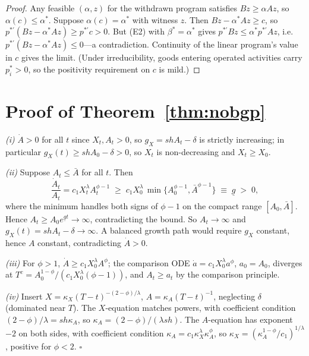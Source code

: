 \documentclass[11pt]{article}
\begin{document}
\begin{proof}
Any feasible $(\alpha,z)$ for the withdrawn program satisfies $Bz \ge \alpha Az$, so $\alpha(c) \le \alpha^{*}$. Suppose $\alpha(c)=\alpha^{*}$ with witness $z$. Then $Bz - \alpha^{*}Az \ge c$, so $p^{*\prime}(Bz-\alpha^{*}Az) \ge p^{*\prime}c > 0$. But (E2) with $\beta^{*}=\alpha^{*}$ gives $p^{*\prime}Bz \le \alpha^{*}p^{*\prime}Az$, i.e.\ $p^{*\prime}(Bz-\alpha^{*}Az) \le 0$---a contradiction. Continuity of the linear program's value in $c$ gives the limit. (Under irreducibility, goods entering operated activities carry $p^{*}_i>0$, so the positivity requirement on $c$ is mild.)
\end{proof}

\section{Proof of Theorem~\ref{thm:nobgp}}\label{app:nobgp}

\emph{(i)} $\dot A>0$ for all $t$ since $X_t,A_t>0$, so $g_X = shA_t-\delta$ is strictly increasing; in particular $g_X(t) \ge shA_0-\delta>0$, so $X_t$ is non-decreasing and $X_t \ge X_0$.

\emph{(ii)} Suppose $A_t \le \bar A$ for all $t$. Then
\[
\frac{\dot A_t}{A_t} = c_1 X_t^{\lambda}A_t^{\phi-1} \;\ge\; c_1 X_0^{\lambda}\,\min\{A_0^{\phi-1},\bar A^{\phi-1}\} \;\equiv\; \underline g \;>\; 0,
\]
where the minimum handles both signs of $\phi-1$ on the compact range $[A_0,\bar A]$. Hence $A_t \ge A_0 e^{\underline g t}\to\infty$, contradicting the bound. So $A_t\to\infty$ and $g_X(t) = shA_t-\delta \to\infty$. A balanced growth path would require $g_X$ constant, hence $A$ constant, contradicting $\dot A>0$.

\emph{(iii)} For $\phi>1$, $\dot A \ge c_1X_0^{\lambda}A^{\phi}$; the comparison ODE $\dot a = c_1X_0^{\lambda}a^{\phi}$, $a_0 = A_0$, diverges at $T^{c} = A_0^{1-\phi}/(c_1X_0^{\lambda}(\phi-1))$, and $A_t \ge a_t$ by the comparison principle.

\emph{(iv)} Insert $X = \kappa_X(T-t)^{-(2-\phi)/\lambda}$, $A = \kappa_A(T-t)^{-1}$, neglecting $\delta$ (dominated near $T$). The $X$-equation matches powers, with coefficient condition $(2-\phi)/\lambda = sh\kappa_A$, so $\kappa_A = (2-\phi)/(\lambda sh)$. The $A$-equation has exponent $-2$ on both sides, with coefficient condition $\kappa_A = c_1\kappa_X^{\lambda}\kappa_A^{\phi}$, so $\kappa_X = (\kappa_A^{1-\phi}/c_1)^{1/\lambda}$, positive for $\phi<2$. \hfill$\square$
\end{document}
